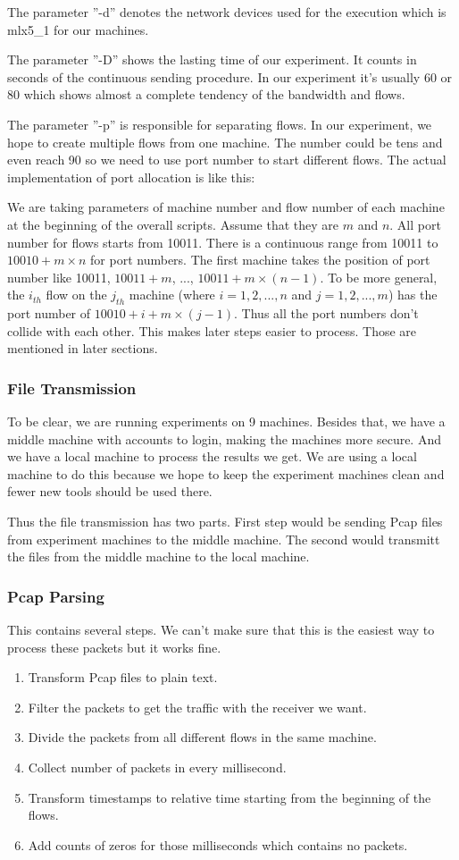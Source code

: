 \documentclass[12pt,a4paper]{article}
\begin{document}
The parameter ''-d'' denotes the network devices used for the execution which is mlx5\_1 for our machines.

The parameter ''-D'' shows the lasting time of our experiment. It counts in seconds of the continuous sending procedure.
In our experiment it's usually 60 or 80 which shows almost a complete tendency of the bandwidth and flows.

The parameter ''-p'' is responsible for separating flows. In our experiment, we hope to create multiple flows from one machine.
The number could be tens and even reach 90 so we need to use port number to start different flows.
The actual implementation of port allocation is like this: 

We are taking parameters of machine number and flow number of each machine at the beginning of the overall scripts.
Assume that they are $m$ and $n$.
All port number for flows starts from 10011. There is a continuous range from 10011 to $10010+m\times n$ for port numbers.
The first machine takes the position of port number like 10011, $10011+m$, ..., $10011+m\times(n-1)$.
To be more general, the $i_{th}$ flow on the $j_{th}$ machine (where $i=1,2,...,n$ and $j=1,2,...,m$) has the port number of
$10010+i+m\times(j-1)$.
Thus all the port numbers don't collide with each other. This makes later steps easier to process.
Those are mentioned in later sections.

\subsubsection{File Transmission}
To be clear, we are running experiments on 9 machines.
Besides that, we have a middle machine with accounts to login, making the machines more secure.
And we have a local machine to process the results we get. We are using a local machine to do this because
we hope to keep the experiment machines clean and fewer new tools should be used there.

Thus the file transmission has two parts. First step would be sending Pcap files from experiment machines to the middle machine.
The second would transmitt the files from the middle machine to the local machine.

\subsubsection{Pcap Parsing}
This contains several steps. We can't make sure that this is the easiest way to process these packets but it works fine.
\begin{enumerate}
	\item Transform Pcap files to plain text.
	\item Filter the packets to get the traffic with the receiver we want.
	\item Divide the packets from all different flows in the same machine.
	\item Collect number of packets in every millisecond.
	\item Transform timestamps to relative time starting from the beginning of the flows.
	\item Add counts of zeros for those milliseconds which contains no packets.
\end{enumerate}
\end{document}
